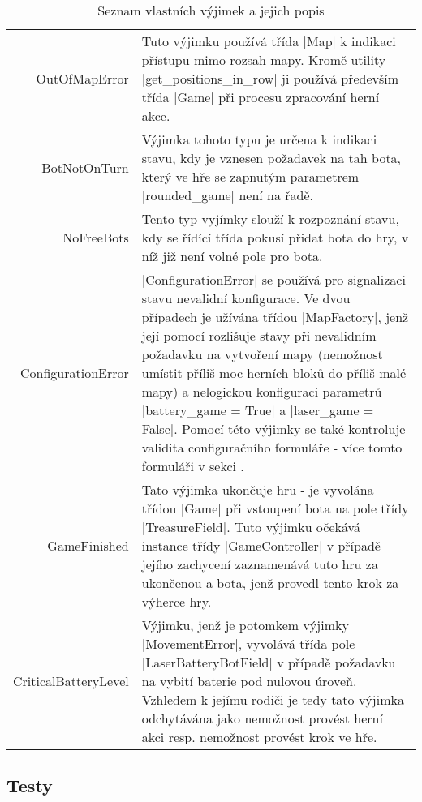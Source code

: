 \begin{table}[H]
	\renewcommand{\arraystretch}{1.2}
	\centering
	
	\begin{tabular}{ B || p{.6\textwidth} }
		OutOfMapError & Tuto výjimku používá třída \ic|Map| k indikaci přístupu mimo rozsah mapy. Kromě utility \ic|get_positions_in_row| ji používá především třída \ic|Game| při procesu zpracování herní akce. \\

		BotNotOnTurn & Výjimka tohoto typu je určena k indikaci stavu, kdy je vznesen požadavek na tah bota, který ve hře se zapnutým parametrem \ic|rounded_game| není na řadě. \\

		NoFreeBots & Tento typ vyjímky slouží k rozpoznání stavu, kdy se řídící třída pokusí přidat bota do hry, v níž již není volné pole pro bota. \\

		ConfigurationError & \ic|ConfigurationError| se používá pro signalizaci stavu nevalidní konfigurace. Ve dvou případech je užívána třídou \ic|MapFactory|, jenž její pomocí rozlišuje stavy při nevalidním požadavku na vytvoření mapy (nemožnost umístit příliš moc herních bloků do příliš malé mapy) a nelogickou konfiguraci parametrů \ic|battery_game = True| a \ic|laser_game = False|. Pomocí této výjimky se také kontroluje validita configuračního formuláře - více tomto formuláři v sekci . \\

		GameFinished & Tato výjimka ukončuje hru - je vyvolána třídou \ic|Game| při vstoupení bota na pole třídy \ic|TreasureField|. Tuto výjimku očekává instance třídy \ic|GameController| v případě jejího zachycení zaznamenává tuto hru za ukončenou a bota, jenž provedl tento krok za výherce hry. \\

		CriticalBatteryLevel & Výjimku, jenž je potomkem výjimky \ic|MovementError|, vyvolává třída pole \ic|LaserBatteryBotField| v případě požadavku na vybití baterie pod nulovou úroveň. Vzhledem k jejímu rodiči je tedy tato výjimka odchytávána jako nemožnost provést herní akci resp. nemožnost provést krok ve hře. \\
	\end{tabular}
	\caption{Seznam vlastních výjimek a jejich popis}
\end{table}

\subsection{Testy}

